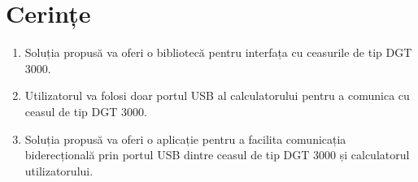 \section{Cerințe}
\begin{enumerate}
	\item Soluția propusă va oferi o bibliotecă pentru interfața cu ceasurile de tip DGT 3000.
	\item Utilizatorul va folosi doar portul USB al calculatorului pentru a comunica cu ceasul de tip DGT 3000.
	\item Soluția propusă va oferi o aplicație pentru a facilita comunicația biderecțională prin portul USB dintre ceasul de tip DGT 3000 și calculatorul utilizatorului.
\end{enumerate}